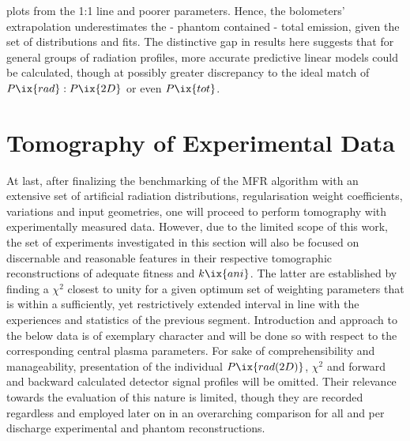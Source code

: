 plots from the 1:1 line and poorer parameters. Hence, the bolometers' extrapolation underestimates the - phantom contained - total emission, given the set of distributions and fits. The distinctive gap in results here suggests that for general groups of radiation profiles, more accurate predictive linear models could be calculated, though at possibly greater discrepancy to the ideal match of $P\ix{rad}:P\ix{2D}$ or even $P\ix{tot}$.%
%
    \section{Tomography of Experimental Data}\label{sec:expdata}%
%
        At last, after finalizing the benchmarking of the MFR algorithm with an extensive set of artificial radiation distributions, regularisation weight coefficients, variations and input geometries, one will proceed to perform tomography with experimentally measured data. However, due to the limited scope of this work, the set of experiments investigated in this section will also be focused on discernable and reasonable features in their respective tomographic reconstructions of adequate fitness and $k\ix{ani}$. The latter are established by finding a $\chi^{2}$ closest to unity for a given optimum set of weighting parameters that is within a sufficiently, yet restrictively extended interval in line with the experiences and statistics of the previous segment. Introduction and approach to the below data is of exemplary character and will be done so with respect to the corresponding central plasma parameters. For sake of comprehensibility and manageability, presentation of the individual $P\ix{rad(2D)}$, $\chi^{2}$ and forward and backward calculated detector signal profiles will be omitted. Their relevance towards the evaluation of this nature is limited, though they are recorded regardless and employed later on in an overarching comparison for all and per discharge experimental and phantom reconstructions.%
%
